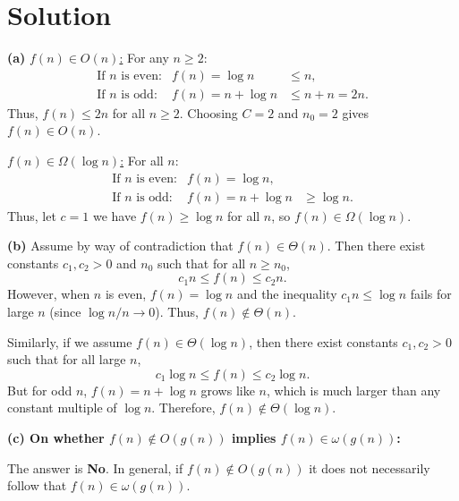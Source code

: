 \documentclass[11pt]{article}
\begin{document}
    \section*{Solution}
    \textbf{(a)}
    \medskip
    \underline{\(f(n)\in O(n)\):}  
    For any \(n\ge 2\):
    \[
    \begin{array}{rcl}
    \text{If } n \text{ is even:} & f(n)= \log n &\le n,\\[1mm]
    \text{If } n \text{ is odd:} & f(n)= n+\log n &\le n+n = 2n.
    \end{array}
    \]
    Thus, \(f(n)\le 2n\) for all \(n\ge 2\). Choosing \(C=2\) and \(n_0=2\) gives \(f(n)\in O(n)\).

    \medskip

    \underline{\(f(n)\in \Omega(\log n)\):}  
    For all \(n\):
    \[
    \begin{array}{rcl}
    \text{If } n \text{ is even:} & f(n)= \log n,\\[1mm]
    \text{If } n \text{ is odd:} & f(n)= n+\log n &\ge \log n.
    \end{array}
    \]
    Thus, let \(c=1\) we have \(f(n)\ge \log n\) for all \(n\), so \(f(n)\in \Omega(\log n)\).

    \bigskip

    \textbf{(b)}
    \medskip Assume by way of contradiction that \(f(n)\in \Theta(n)\). Then there exist constants \(c_1, c_2>0\) and \(n_0\) such that for all \(n\ge n_0\),
    \[
    c_1 n \le f(n) \le c_2 n.
    \]
    However, when \(n\) is even, \(f(n)=\log n\) and the inequality \(c_1 n \le \log n\) fails for large \(n\) (since \(\log n/n\to 0\)). Thus, \(f(n)\notin \Theta(n)\).

    Similarly, if we assume \(f(n)\in \Theta(\log n)\), then there exist constants \(c_1, c_2>0\) such that for all large \(n\),
    \[
    c_1 \log n \le f(n) \le c_2 \log n.
    \]
    But for odd \(n\), \(f(n)= n+\log n\) grows like \(n\), which is much larger than any constant multiple of \(\log n\). Therefore, \(f(n)\notin \Theta(\log n)\).

    \bigskip

    \textbf{(c) On whether \(f(n)\notin O(g(n))\) implies \(f(n)\in \omega(g(n))\):}

    \medskip

    The answer is \textbf{No}. In general, if \(f(n)\notin O(g(n))\) it does not necessarily follow that \(f(n)\in \omega(g(n))\).

    \medskip
\end{document}

